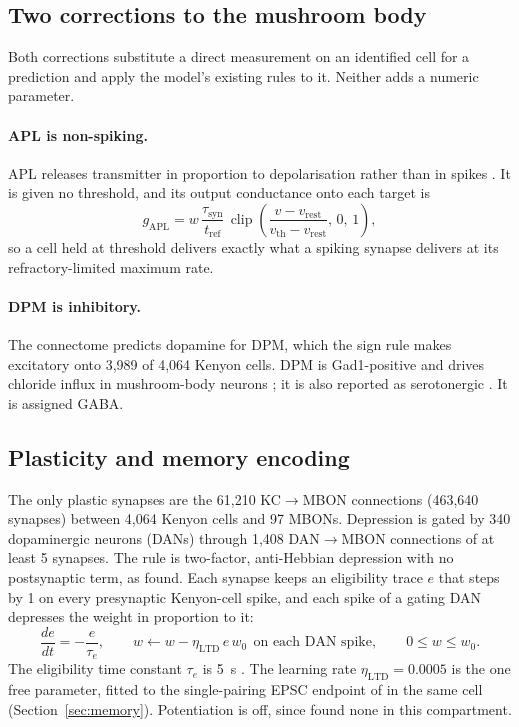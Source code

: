 \documentclass[11pt]{article}
\newcommand{\KCMBON}{KC$\rightarrow$MBON}
\begin{document}
\subsection{Two corrections to the mushroom body}
Both corrections substitute a direct measurement on an identified cell for a prediction and apply the model's existing rules to it. Neither adds a numeric parameter.

\paragraph{APL is non-spiking.} APL releases transmitter in proportion to depolarisation rather than in spikes \citep{amin2020}. It is given no threshold, and its output conductance onto each target is
\begin{equation}
g_{\mathrm{APL}} = w\,\frac{\tau_{\mathrm{syn}}}{t_{\mathrm{ref}}}\,\operatorname{clip}\!\left(\frac{v - v_{\mathrm{rest}}}{v_{\mathrm{th}} - v_{\mathrm{rest}}},\,0,\,1\right),
\label{eq:graded}
\end{equation}
so a cell held at threshold delivers exactly what a spiking synapse delivers at its refractory-limited maximum rate.

\paragraph{DPM is inhibitory.} The connectome predicts dopamine for DPM, which the sign rule makes excitatory onto 3,989 of 4,064 Kenyon cells. DPM is Gad1-positive and drives chloride influx in mushroom-body neurons \citep{haynes2015}; it is also reported as serotonergic \citep{lee2011}. It is assigned GABA.

\subsection{Plasticity and memory encoding}
The only plastic synapses are the 61,210 \KCMBON{} connections (463,640 synapses) between 4,064 Kenyon cells and 97 MBONs. Depression is gated by 340 dopaminergic neurons (DANs) through 1,408 DAN$\rightarrow$MBON connections of at least 5 synapses. The rule is two-factor, anti-Hebbian depression with no postsynaptic term, as \citet{hige2015} found. Each synapse keeps an eligibility trace $e$ that steps by 1 on every presynaptic Kenyon-cell spike, and each spike of a gating DAN depresses the weight in proportion to it:
\begin{equation}
\frac{de}{dt} = -\frac{e}{\tau_e}, \qquad w \leftarrow w - \eta_{\mathrm{LTD}}\, e\, w_0 \ \ \text{on each DAN spike}, \qquad 0 \le w \le w_0 .
\label{eq:plasticity}
\end{equation}
The eligibility time constant $\tau_e$ is 5~s \citep{jiang2021}. The learning rate $\eta_{\mathrm{LTD}} = 0.0005$ is the one free parameter, fitted to the single-pairing EPSC endpoint of \citet{hige2015} in the same cell (Section~\ref{sec:memory}). Potentiation is off, since \citet{hige2015} found none in this compartment.
\end{document}
